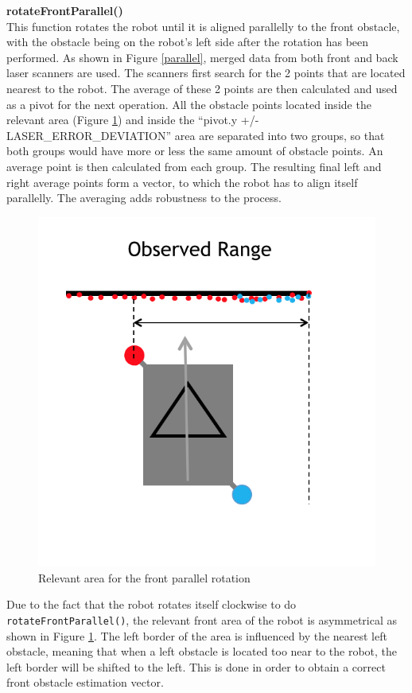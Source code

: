 \begin{description}
\item \textbf{rotateFrontParallel()} \hfill \\
This function rotates the robot until it is aligned parallelly to the front obstacle, with the obstacle being on the robot's left side after the rotation has been performed. As shown in Figure \ref{parallel}, merged data from both front and back laser scanners are used. The scanners first search for the 2 points that are located nearest to the robot. The average of these 2 points are then calculated and used as a pivot for the next operation. All the obstacle points located inside the relevant area (Figure \ref{betrachteter_bereich}) and inside the ``pivot.y +/- LASER\_ERROR\_DEVIATION'' area are separated into two groups, so that both groups would have more or less the same amount of obstacle points. An average point is then calculated from each group. The resulting final left and right average points form a vector, to which the robot has to align itself parallelly. The averaging adds robustness to the process.

\begin{figure}[htb]
\centering
\includegraphics[scale=0.8]{graphics/betrachteter_bereich.png}
\caption{Relevant area for the front parallel rotation}
\label{betrachteter_bereich}
\centering
\end{figure}

Due to the fact that the robot rotates itself clockwise to do \texttt{rotateFrontParallel()}, the relevant front area of the robot is asymmetrical as shown in Figure \ref{betrachteter_bereich}. The left border of the area is influenced by the nearest left obstacle, meaning that when a left obstacle is located too near to the robot, the left border will be shifted to the left. This is done in order to obtain a correct front obstacle estimation vector.
\end{description}

